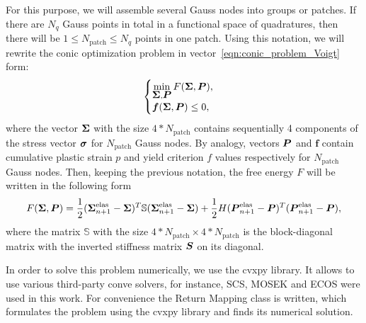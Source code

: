 \documentclass[12pt]{article}
\begin{document}
For this purpose, we will assemble several Gauss nodes into groups or patches. If there are $N_q$ Gauss points in total in a functional space of quadratures, then there will be $1 \leq N_\text{patch} \leq N_q$ points in one patch. Using this notation, we will rewrite the conic optimization problem in vector~\ref{eqn:conic_problem_Voigt} form:
\begin{equation}
    \label{eqn:conic_problem_vectorized}
    \begin{cases}
        \min\limits_{\mbox{\boldmath $\Sigma$}, \mbox{\boldmath $P$}} F(\mbox{\boldmath $\Sigma$}, \mbox{\boldmath $P$}), \\
        \mbox{\boldmath $f$}(\mbox{\boldmath $\Sigma$}, \mbox{\boldmath $P$}) \leq 0,
    \end{cases}
\end{equation}
where the vector $\mbox{\boldmath $\Sigma$}$ with the size $4*N_\text{patch}$ contains sequentially 4 components of the stress vector $\mbox{\boldmath$\sigma$}$ for $N_\text{patch}$ Gauss nodes. By analogy, vectors $\mbox{\boldmath $P$}$ and $\mathbold{f}$ contain cumulative plastic strain $p$ and yield criterion $f$ values respectively for $N_\text{patch}$ Gauss nodes. Then, keeping the previous notation, the free energy $F$ will be written in the following form 
\begin{equation}
    F(\mbox{\boldmath $\Sigma$}, \mbox{\boldmath $P$}) = \frac{1}{2}(\mbox{\boldmath $\Sigma$}_{n+1}^\text{elas} - \mbox{\boldmath $\Sigma$})^T \mathbb{S} (\mbox{\boldmath $\Sigma$}_{n+1}^\text{elas} - \mbox{\boldmath $\Sigma$}) + \frac{1}{2}H(\mbox{\boldmath $P$}_{n+1}^\text{elas} - \mbox{\boldmath $P$})^T(\mbox{\boldmath $P$}_{n+1}^\text{elas} - \mbox{\boldmath $P$}),
\end{equation}
where the matrix $\mathbb{S}$ with the size $4*N_\text{patch}\times4*N_\text{patch}$ is the block-diagonal matrix with the inverted stiffness matrix $\mbox{\boldmath $S$}$ on its diagonal.

In order to solve this problem numerically, we use the cvxpy library. It allows to use various third-party conve solvers, for instance, SCS, MOSEK and ECOS were used in this work. For convenience the Return Mapping class is written, which formulates the problem using the cvxpy library and finds its numerical solution.
\end{document}
